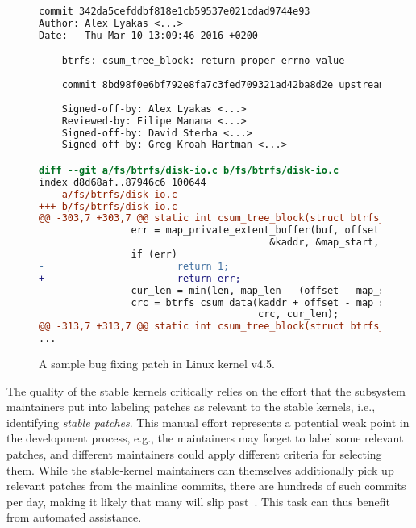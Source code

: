 \begin{figure}[t!]
\begin{lstlisting}[language=diff]
commit 342da5cefddbf818e1cb59537e021cdad9744e93
Author: Alex Lyakas <...>
Date:   Thu Mar 10 13:09:46 2016 +0200

    btrfs: csum_tree_block: return proper errno value
    
    commit 8bd98f0e6bf792e8fa7c3fed709321ad42ba8d2e upstream.
    
    Signed-off-by: Alex Lyakas <...>
    Reviewed-by: Filipe Manana <...>
    Signed-off-by: David Sterba <...>
    Signed-off-by: Greg Kroah-Hartman <...>

diff --git a/fs/btrfs/disk-io.c b/fs/btrfs/disk-io.c
index d8d68af..87946c6 100644
--- a/fs/btrfs/disk-io.c
+++ b/fs/btrfs/disk-io.c
@@ -303,7 +303,7 @@ static int csum_tree_block(struct btrfs_fs_info *fs_info,
                err = map_private_extent_buffer(buf, offset, 32,
                                        &kaddr, &map_start, &map_len);
                if (err)
-                       return 1;
+                       return err;
                cur_len = min(len, map_len - (offset - map_start));
                crc = btrfs_csum_data(kaddr + offset - map_start,
                                      crc, cur_len);
@@ -313,7 +313,7 @@ static int csum_tree_block(struct btrfs_fs_info *fs_info,
...
\end{lstlisting}\vspace{-0.4cm}
\caption{A sample bug fixing patch in Linux kernel v4.5.}
\label{fig:sample_patch}\vspace{-0.4cm}
\end{figure}

The quality of the stable kernels critically relies on the effort that the
subsystem maintainers put into labeling patches as relevant to the
stable kernels, i.e., identifying \textit{stable patches}. This manual
effort represents a potential weak point in the development process, e.g., the maintainers may forget to label some relevant patches, and
different maintainers could apply different criteria for
selecting them. While the stable-kernel maintainers can themselves
additionally pick up relevant patches from the mainline commits, there are
hundreds of such commits per day, making it likely that many will slip
past~\cite{lee2003firm}. This task can thus benefit from automated assistance.

